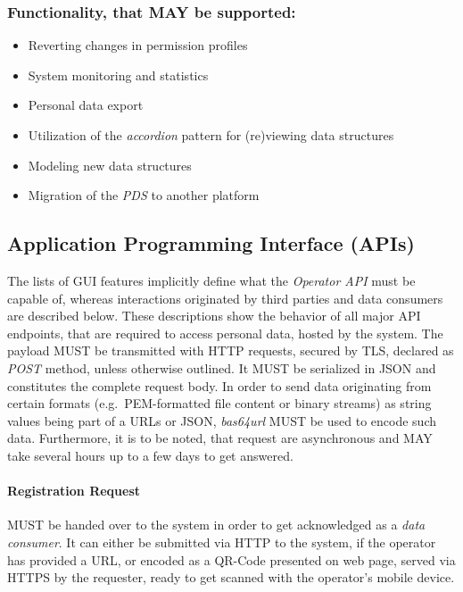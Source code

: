 \documentclass[12pt,english,a4paper,titlepage,cleardoublepage=empty,dottedtoc]{report}
\providecommand{\tightlist}{%
  \setlength{\itemsep}{0pt}\setlength{\parskip}{0pt}}
\begin{document}
\subsubsection{Functionality, that MAY be
supported:}\label{functionality-that-may-be-supported}

\begin{itemize}
\tightlist
\item
  Reverting changes in permission profiles
\item
  System monitoring and statistics
\item
  Personal data export
\item
  Utilization of the \emph{accordion} pattern for (re)viewing data
  structures
\item
  Modeling new data structures
\item
  Migration of the \emph{PDS} to another platform
\end{itemize}

\subsection{Application Programming Interface
(APIs)}\label{application-programming-interface-apis}

The lists of GUI features implicitly define what the \emph{Operator API}
must be capable of, whereas interactions originated by third parties and
data consumers are described below. These descriptions show the behavior
of all major API endpoints, that are required to access personal data,
hosted by the system. The payload MUST be transmitted with HTTP
requests, secured by TLS, declared as \emph{POST} method, unless
otherwise outlined. It MUST be serialized in JSON and constitutes the
complete request body. In order to send data originating from certain
formats (e.g.~PEM-formatted file content or binary streams) as string
values being part of a URLs or JSON, \emph{bas64url} MUST be used to
encode such data. Furthermore, it is to be noted, that request are
asynchronous and MAY take several hours up to a few days to get
answered.

\paragraph{Registration Request}\label{spec_api_registration-request}

MUST be handed over to the system in order to get acknowledged as a
\emph{data consumer}. It can either be submitted via HTTP to the system,
if the operator has provided a URL, or encoded as a QR-Code presented on
web page, served via HTTPS by the requester, ready to get scanned with
the operator's mobile device.
\end{document}
